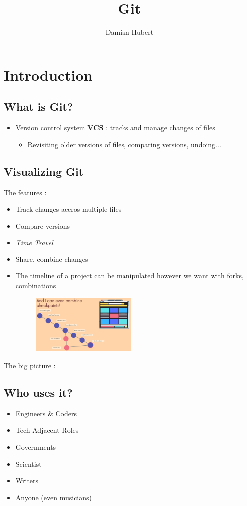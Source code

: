 \documentclass{report}
\author{Damian Hubert}
\title{Git}
\begin{document}
\maketitle
\tableofcontents



\chapter{Introduction}


\section{What is Git?}
\begin{itemize}
	\item Version control system \textbf{VCS} : tracks and manage changes of files 
	\begin{itemize}
		\item Revisiting older versions of files, comparing versions, undoing...
	\end{itemize}
\end{itemize}


\section{Visualizing Git}
The features :
\begin{itemize}
	\item Track changes accros multiple files
	\item Compare versions
	\item \textit{Time Travel}  
	\item Share, combine changes
	\item The timeline of a project can be manipulated however we want with forks, combinations
		\begin{figure}[H] 
	 \centering 
	 \includegraphics[width=2in]{screenshots/2022-06-26T21-27-54Z.png} 
	 \end{figure}

\end{itemize}
The big picture : 


\section{Who uses it?}
\begin{itemize}
	\item Engineers \& Coders
	\item Tech-Adjacent Roles
	\item Governments 
	\item Scientist
	\item Writers
	\item Anyone (even musicians)
\end{itemize}
\end{document}

